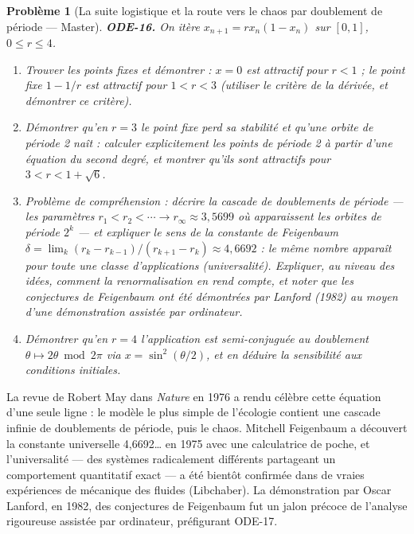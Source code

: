 \documentclass[11pt]{article}
\newtheorem{problem}{Problème}
\begin{document}
\begin{problem}[{La suite logistique et la route vers le chaos par doublement de période --- Master}]
\textbf{ODE-16.} On itère $ x_{n+1} = r x_n (1 - x_n) $ sur
$ [0, 1] $, $ 0 \le r \le 4 $.
\begin{enumerate}
\item[(a)] Trouver les points fixes et démontrer : $ x = 0 $ est attractif pour $ r <1 $ ; le
point fixe $ 1 - 1/r $ est attractif pour $ 1 <r <3 $ (utiliser le critère de la
dérivée, et démontrer ce critère).
\item[(b)] Démontrer qu'en $ r = 3 $ le point fixe perd sa stabilité et qu'une orbite de période 2
naît : calculer explicitement les points de période 2 à partir d'une équation du second degré,
et montrer qu'ils sont attractifs pour $ 3 <r <1 + \sqrt{6} $.
\item[(c)] Problème de compréhension : décrire la cascade de doublements de période --- les paramètres
$ r_1 <r_2 <\cdots \to r_\infty \approx 3{,}5699 $ où apparaissent les orbites de période
$ 2^k $ --- et expliquer le sens de la constante de Feigenbaum
$ \delta = \lim_k (r_k - r_{k-1})/(r_{k+1} - r_k) \approx 4{,}6692 $ : le même nombre apparaît
pour toute une classe d'applications (universalité). Expliquer, au niveau des idées, comment la
renormalisation en rend compte, et noter que les conjectures de Feigenbaum ont été démontrées par
Lanford (1982) au moyen d'une démonstration assistée par ordinateur.
\item[(d)] Démontrer qu'en $ r = 4 $ l'application est semi-conjuguée au doublement
$ \theta \mapsto 2\theta \bmod 2\pi $ via $ x = \sin^2(\theta/2) $, et en déduire la
sensibilité aux conditions initiales.
\end{enumerate}

\end{problem}

\noindent La revue de Robert May dans \textit{Nature} en 1976 a rendu célèbre cette
équation d'une seule ligne : le modèle le plus simple de l'écologie contient une cascade infinie
de doublements de période, puis le chaos. Mitchell Feigenbaum a découvert la constante universelle
4,6692\dots{} en 1975 avec une calculatrice de poche, et l'universalité --- des systèmes radicalement
différents partageant un comportement quantitatif exact --- a été bientôt confirmée dans de vraies
expériences de mécanique des fluides (Libchaber). La démonstration par Oscar Lanford, en 1982, des
conjectures de Feigenbaum fut un jalon précoce de l'analyse rigoureuse assistée par ordinateur,
préfigurant ODE-17.
\end{document}
